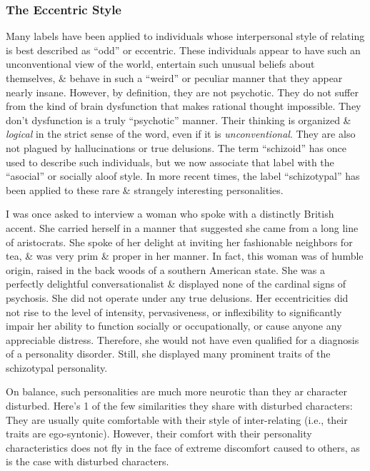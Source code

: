 \documentclass{article}
\numberwithin{equation}{section}
\begin{document}
\subsubsection{The Eccentric Style}
Many labels have been applied to individuals whose interpersonal style of relating is best described as ``odd'' or eccentric. These individuals appear to have such an unconventional view of the world, entertain such unusual beliefs about themselves, \& behave in such a ``weird'' or peculiar manner that they appear nearly insane. However, by definition, they are not psychotic. They do not suffer from the kind of brain dysfunction that makes rational thought impossible. They don't dysfunction is a truly ``psychotic'' manner. Their thinking is organized \& \textit{logical} in the strict sense of the word, even if it is \textit{unconventional}. They are also not plagued by hallucinations or true delusions. The term ``schizoid'' has once used to describe such individuals, but we now associate that label with the ``asocial'' or socially aloof style. In more recent times, the label ``schizotypal'' has been applied to these rare \& strangely interesting personalities.

I was once asked to interview a woman who spoke with a distinctly British accent. She carried herself in a manner that suggested she came from a long line of aristocrats. She spoke of her delight at inviting her fashionable neighbors for tea, \& was very prim \& proper in her manner. In fact, this woman was of humble origin, raised in the back woods of a southern American state. She was a perfectly delightful conversationalist \& displayed none of the cardinal signs of psychosis. She did not operate under any true delusions. Her eccentricities did not rise to the level of intensity, pervasiveness, or inflexibility to significantly impair her ability to function socially or occupationally, or cause anyone any appreciable distress. Therefore, she would not have even qualified for a diagnosis of a personality disorder. Still, she displayed many prominent traits of the schizotypal personality.

On balance, such personalities are much more neurotic than they ar character disturbed. Here's 1 of the few similarities they share with disturbed characters: They are usually quite comfortable with their style of inter-relating (i.e., their traits are ego-syntonic). However, their comfort with their personality characteristics does not fly in the face of extreme discomfort caused to others, as is the case with disturbed characters.
\end{document}
